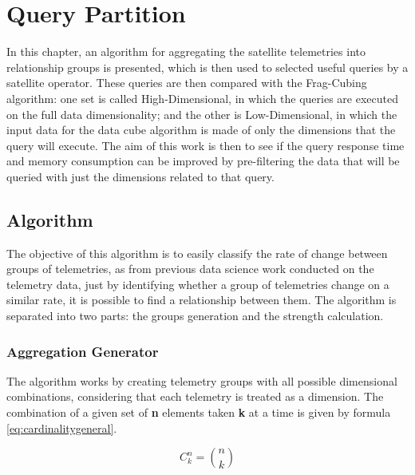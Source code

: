 
\chapter{Query Partition}\label{ch:querypart}

In this chapter, an algorithm for aggregating the satellite telemetries into relationship groups is presented, which is then used to selected useful queries by a satellite operator.
These queries are then compared with the Frag-Cubing algorithm: one set is called High-Dimensional, in which the queries are executed on the full data dimensionality; and the other is Low-Dimensional, in which the input data for the data cube algorithm is made of only the dimensions that the query will execute.
The aim of this work is then to see if the query response time and memory consumption can be improved by pre-filtering the data that will be queried with just the dimensions related to that query.

\section{Algorithm}\label{ch:querypart:heur}

The objective of this algorithm is to easily classify the rate of change between groups of telemetries, as from previous data science work conducted on the telemetry data, just by identifying whether a group of telemetries change on a similar rate, it is possible to find a relationship between them.
The algorithm is separated into two parts: the groups generation and the strength calculation.

\hypertarget{aggregation-generator}{%
\subsection{Aggregation Generator}\label{ch:querypart:heur:agg}}

The algorithm works by creating telemetry groups with all possible dimensional combinations, considering that each telemetry is treated as a dimension.
The combination of a given set of \textbf{n} elements taken \textbf{k} at a time is given by formula \ref{eq:cardinalitygeneral}.

\begin{equation} \label{eq:cardinalitygeneral}
C_k^n = \binom{n}{k}
\end{equation}

